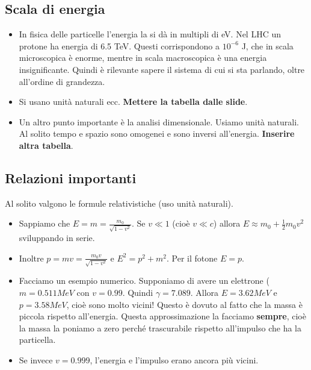 \subsection{Scala di energia}
\begin{itemize}
    \item In fisica delle particelle l'energia la si dà in multipli di eV. Nel LHC un protone ha energia di 6.5 TeV. Questi corrispondono a $10^{-6}$ J, che in scala microscopica è enorme, mentre in scala macroscopica è una energia insignificante. Quindi è rilevante sapere il sistema di cui si sta parlando, oltre all'ordine di grandezza.
    \item Si usano unità naturali ecc. \textbf{Mettere la tabella dalle slide}.
    \item Un altro punto importante è la analisi dimensionale. Usiamo unità naturali. Al solito tempo e spazio sono omogenei e sono inversi all'energia. \textbf{Inserire altra tabella}.
\end{itemize}
\subsection{Relazioni importanti}
Al solito valgono le formule relativistiche (uso unità naturali).
\begin{itemize}
    \item Sappiamo che $E=m=\frac{m_0}{\sqrt{1-v^2}}$. Se $v\ll 1$ (cioè $v\ll c$) allora $E\approx m_0+\frac12 m_0v^2$ sviluppando in serie.
    \item Inoltre $p=mv=\frac{m_0v}{\sqrt{1-v^2}}$ e $E^2=p^2+m^2$. Per il fotone $E=p$.
    \item Facciamo un esempio numerico. Supponiamo di avere un elettrone ($m=0.511 MeV$ con $v=0.99$. Quindi $\gamma = 7.089$. Allora $E=3.62 MeV$ e $p=3.58 MeV$, cioè sono molto vicini! Questo è dovuto al fatto che la massa è piccola rispetto all'energia. Questa approssimazione la facciamo \textbf{sempre}, cioè la massa la poniamo a zero perché trascurabile rispetto all'impulso che ha la particella. 
    \item Se invece $v=0.999$, l'energia e l'impulso erano ancora più vicini.
\end{itemize}
